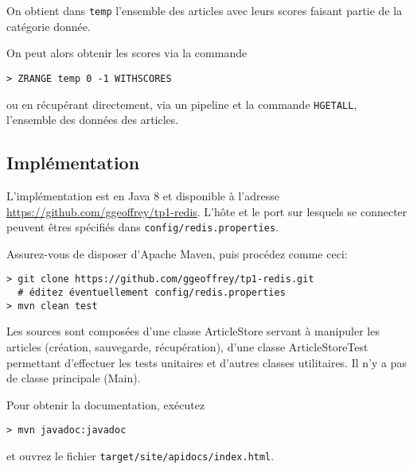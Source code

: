 \documentclass[article,a4paper,12pt]{article}
\begin{document}
On obtient dans \texttt{temp} l'ensemble des articles avec leurs scores faisant
partie de la catégorie donnée.

On peut alors obtenir les scores via la commande
\begin{verbatim}
> ZRANGE temp 0 -1 WITHSCORES
\end{verbatim}

ou en récupérant directement, via un pipeline et la commande \texttt{HGETALL},
l'ensemble des données des articles.

\subsection{Implémentation}
\label{sec:orgheadline11}

L'implémentation est en Java 8 et disponible à l'adresse \url{https://github.com/ggeoffrey/tp1-redis}.
L'hôte et le port sur lesquels se connecter peuvent êtres spécifiés dans \texttt{config/redis.properties}.

Assurez-vous de disposer d'Apache Maven, puis procédez comme ceci:
\begin{verbatim}
> git clone https://github.com/ggeoffrey/tp1-redis.git
  # éditez éventuellement config/redis.properties
> mvn clean test
\end{verbatim}

Les sources sont composées d'une classe ArticleStore servant à manipuler les
articles (création, sauvegarde, récupération), d'une classe ArticleStoreTest
permettant d'effectuer les tests unitaires et d'autres classes utilitaires. Il
n'y a pas de classe principale (Main).

Pour obtenir la documentation, exécutez
\begin{verbatim}
> mvn javadoc:javadoc
\end{verbatim}
et ouvrez le fichier \texttt{target/site/apidocs/index.html}.
\end{document}
